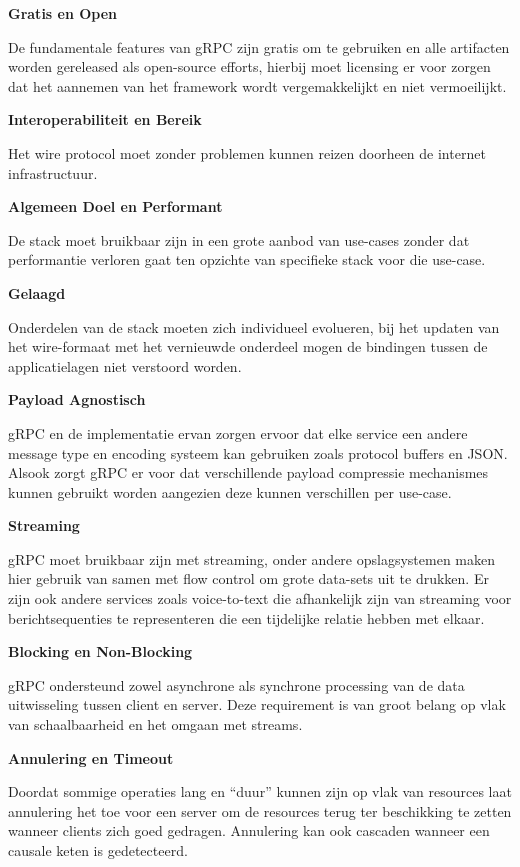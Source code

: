 \textbf{Gratis en Open}

De fundamentale features van gRPC zijn gratis om te gebruiken en  alle artifacten worden gereleased als open-source efforts, hierbij moet licensing er voor zorgen dat het aannemen van het framework wordt vergemakkelijkt en niet vermoeilijkt.

\textbf{Interoperabiliteit en Bereik}

Het wire protocol moet zonder problemen kunnen reizen doorheen de internet infrastructuur.

\textbf{Algemeen Doel en Performant}

De stack moet bruikbaar zijn in een grote aanbod van use-cases zonder dat performantie verloren gaat ten opzichte van specifieke stack voor die use-case.

\textbf{Gelaagd}

Onderdelen van de stack moeten zich individueel evolueren, bij het updaten van het wire-formaat met het vernieuwde onderdeel mogen de bindingen tussen de applicatielagen niet verstoord worden.

\textbf{Payload Agnostisch}

gRPC en de implementatie ervan zorgen ervoor dat elke service  een andere message type en encoding systeem kan gebruiken zoals protocol buffers en JSON. Alsook zorgt gRPC er voor dat verschillende payload compressie mechanismes kunnen gebruikt worden aangezien deze kunnen verschillen per use-case.

\textbf{Streaming}

gRPC moet bruikbaar zijn met streaming, onder andere opslagsystemen maken hier gebruik van samen met flow control om grote data-sets uit te drukken. Er zijn ook andere services zoals voice-to-text die afhankelijk zijn van streaming voor berichtsequenties te representeren die een tijdelijke relatie hebben met elkaar.

\textbf{Blocking en Non-Blocking}

gRPC ondersteund zowel asynchrone als synchrone processing van de data uitwisseling tussen client en server. Deze requirement is van groot belang op vlak van schaalbaarheid en het omgaan met streams.

\textbf{Annulering en Timeout}

Doordat sommige operaties lang en “duur” kunnen zijn op vlak van resources laat annulering het toe voor een server om de resources terug ter beschikking te zetten wanneer clients zich goed gedragen. Annulering kan ook cascaden wanneer een causale keten is gedetecteerd.

